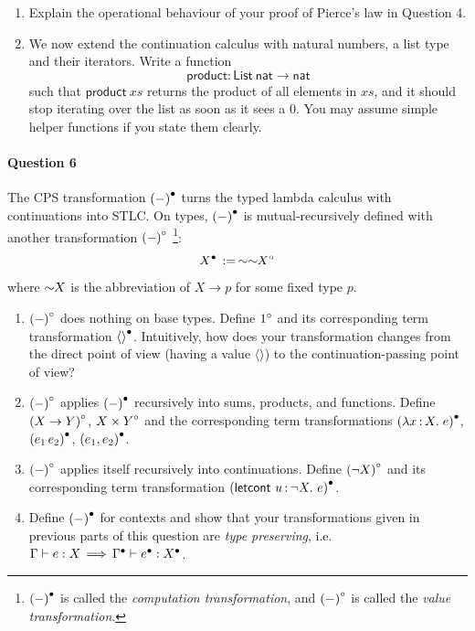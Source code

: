 \documentclass[11pt,a4paper,twoside]{article}
\begin{document}
\begin{enumerate}[label=(\alph*)]
  \item Explain the operational behaviour of your proof of Pierce's
    law in Question 4.

  \item We now extend the continuation calculus with natural numbers,
    a list type and their iterators.
    Write a function
    \[\mathsf{product} : \mathsf{List}\ \mathsf{nat} \to \mathsf{nat}\]
    such that $\mathsf{product}\ xs$ returns the product of all
    elements in $xs$,
    and it should stop iterating over the list as soon as it sees a $0$.
    You may assume simple helper functions if you state them clearly.
\end{enumerate}

\paragraph{Question 6} The CPS transformation ${(-)}^{\bullet}$
turns the typed lambda calculus with continuations into STLC.
On types, ${(-)}^{\bullet}$ is mutual-recursively defined with another
transformation ${(-)}^{\circ}$
\footnote{${(-)}^{\bullet}$ is called the \emph{computation transformation},
and  ${(-)}^{\circ}$ is called the \emph{value transformation}.}:
\[
  {X}^{\bullet} \,:=\, \sim\sim\!\!{X}^{\circ}
\]
where $\sim\!\!X$ is the abbreviation of $X \to p$ for some fixed type $p$.
\begin{enumerate}[label=(\alph*)]
  \item ${(-)}^{\circ}$ does nothing on base types. Define ${1}^{\circ}$
    and its corresponding term transformation ${\langle\rangle}^{\bullet}$.
    Intuitively, how does your transformation changes from the direct
    point of view
    (having a value $\langle\rangle$)
    to the continuation-passing point of view?

  \item ${(-)}^{\circ}$ applies ${(-)}^{\bullet}$ recursively into sums,
    products, and functions.
    Define ${(X \to Y)}^{\circ}$, ${X \times Y}^{\circ}$
    and the corresponding term transformations
    ${(\lambda x \,{:}\, X .\; e)}^{\bullet}$, ${(e_1 \, e_2)}^{\bullet}$,
    ${(e_1, e_2)}^{\bullet}$.

  \item ${(-)}^{\circ}$ applies itself recursively into continuations.
    Define ${(\neg X)}^{\circ}$
    and its corresponding term transformation
    $\Tdot{\mathsf{(letcont}\ \var{u}{\neg X}.\ e)}$.

  \item Define ${(-)}^{\bullet}$ for contexts and show that your
    transformations given in previous parts of this question
    are \emph{type preserving}, i.e.~$\Gamma \vdash e : X
    \,\Longrightarrow\, {\Gamma}^{\bullet} \vdash {e}^{\bullet} : {X}^{\bullet}$.
\end{enumerate}
\end{document}
